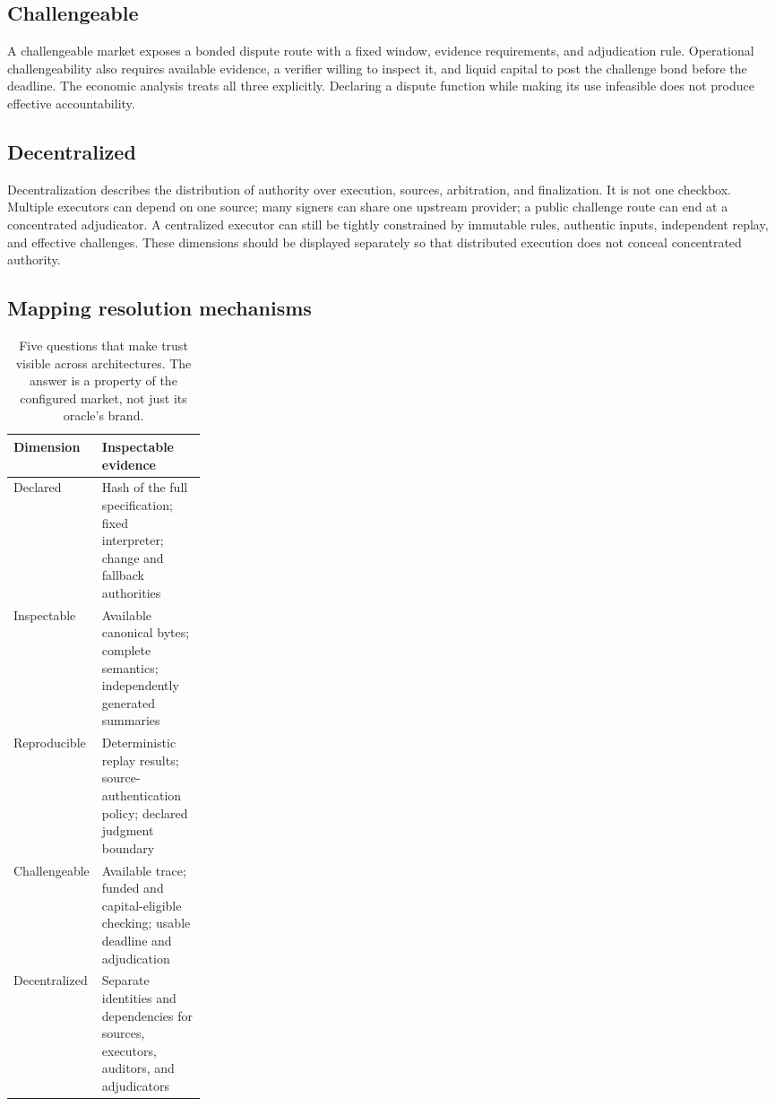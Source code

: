 \documentclass[10pt]{article}
\begin{document}
\subsection{Challengeable}

A challengeable market exposes a bonded dispute route with a fixed window, evidence requirements, and adjudication rule. Operational challengeability also requires available evidence, a verifier willing to inspect it, and liquid capital to post the challenge bond before the deadline. The economic analysis treats all three explicitly. Declaring a dispute function while making its use infeasible does not produce effective accountability.

\subsection{Decentralized}

Decentralization describes the distribution of authority over execution, sources, arbitration, and finalization. It is not one checkbox. Multiple executors can depend on one source; many signers can share one upstream provider; a public challenge route can end at a concentrated adjudicator. A centralized executor can still be tightly constrained by immutable rules, authentic inputs, independent replay, and effective challenges. These dimensions should be displayed separately so that distributed execution does not conceal concentrated authority.

\subsection{Mapping resolution mechanisms}

\begin{table}[t]
\centering
\caption{Five questions that make trust visible across architectures. The answer is a property of the configured market, not just its oracle's brand.}
\label{tab:stratification}
\small
\begin{tabularx}{\linewidth}{@{}p{0.25\linewidth}Y@{}}
\toprule
Dimension & Inspectable evidence \\
\midrule
Declared & Hash of the full specification; fixed interpreter; change and fallback authorities \\
Inspectable & Available canonical bytes; complete semantics; independently generated summaries \\
Reproducible & Deterministic replay results; source-authentication policy; declared judgment boundary \\
Challengeable & Available trace; funded and capital-eligible checking; usable deadline and adjudication \\
Decentralized & Separate identities and dependencies for sources, executors, auditors, and adjudicators \\
\bottomrule
\end{tabularx}
\end{table}
\end{document}
